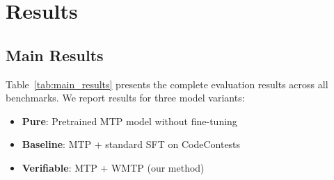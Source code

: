 \section{Results}

\subsection{Main Results}

Table~\ref{tab:main_results} presents the complete evaluation results across all benchmarks. We report results for three model variants:
\begin{itemize}[nosep]
    \item \textbf{Pure}: Pretrained MTP model without fine-tuning
    \item \textbf{Baseline}: MTP + standard SFT on CodeContests
    \item \textbf{Verifiable}: MTP + WMTP (our method)
\end{itemize}

